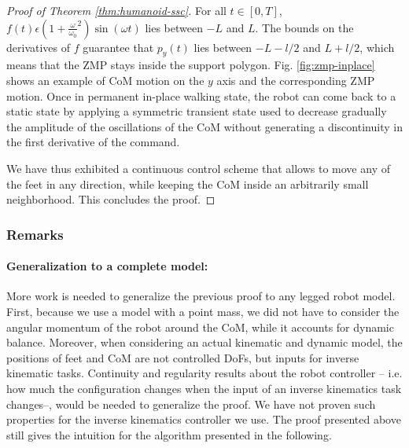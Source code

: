 \documentclass{article}
\begin{document}
\begin{proof}[Proof of Theorem \ref{thm:humanoid-ssc}]
For    all     $t    \in    [0,T]$,    $f(t)     \epsilon    (1    +
\frac{\omega}{\omega_0}^2)  \sin  (\omega t)$  lies  between $-L$  and
$L$. The bounds on the derivatives of $f$ guarantee that $p_y(t)$ lies
between  $-L- l/2$ and  $L+ l/2$,  which means  that the  ZMP stays
inside  the  support  polygon.  Fig.  \ref{fig:zmp-inplace}  shows  an
example  of CoM  motion  on the  $y$  axis and  the corresponding  ZMP
motion. Once in permanent in-place walking state, the robot can come back
to  a static  state by  applying a  symmetric transient  state  used to
decrease  gradually  the amplitude  of  the  oscillations  of the  CoM
without  generating a  discontinuity in  the first  derivative  of the
command.


We have thus exhibited a continuous control scheme that allows to move any of the feet
in any direction, while keeping the CoM inside an arbitrarily small neighborhood. This concludes
the proof.
\end{proof}


\subsubsection{Remarks}
\paragraph{Generalization to a complete model:} More work is needed to generalize 
the previous proof to any legged robot model. First, because we use a model with
a point mass, we did not have to consider the angular momentum of the robot
around the CoM, while it accounts for dynamic balance. Moreover, when considering
an actual kinematic and dynamic model,
the positions of feet and CoM are not controlled DoFs, but inputs 
for inverse kinematic tasks. Continuity and regularity results about the robot
controller -- i.e. how much the configuration changes when the input of an inverse
kinematics task changes--, would be needed to generalize the proof. We have not
proven such properties for the inverse kinematics controller we use. 
The  proof presented above still gives the intuition for the
algorithm presented in the following.
\end{document}
